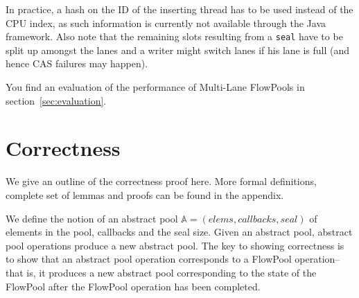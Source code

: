 \documentclass[runningheads,a4paper]{llncs}
\begin{document}
In practice, a hash on the ID of the inserting thread has to be used
instead of the CPU index, as such information is currently not
available through the Java framework. Also note that the remaining
slots resulting from a \verb=seal= have to be split up amongst the
lanes and a writer might switch lanes if his lane is full (and hence
CAS failures may happen).

You find an evaluation of the performance of Multi-Lane FlowPools in
section~\ref{sec:evaluation}.

\section{Correctness}

We give an outline of the correctness proof here. More formal
definitions, complete set of lemmas and proofs can be found in the
appendix.

We define the notion of an abstract pool $\mathbb{A} = (elems,
callbacks, seal)$ of elements in the pool, callbacks and the seal
size.
Given an abstract pool, abstract pool operations produce a new
abstract pool.
The key to showing correctness is to show that an abstract pool operation
corresponds to a FlowPool operation-- that is, it produces a
new abstract pool corresponding to the state of the FlowPool after
the FlowPool operation has been completed.



%
\end{document}
